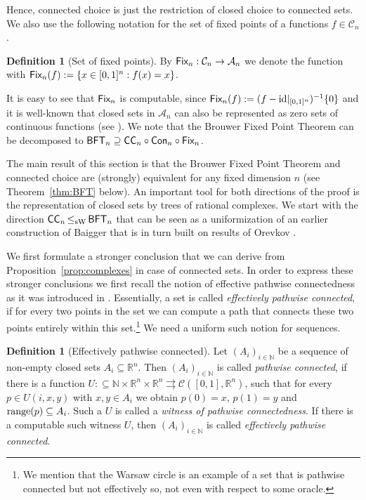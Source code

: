 \documentclass[a4paper]{amsart}
\def\AA{{\mathcal A}}
\def\CC{{\mathcal C}}
\def\IN{{\mathbb{N}}}
\def\IR{{\mathbb{R}}}
\def\In{\subseteq}
\def\mto{\rightrightarrows}
\def\id{{\rm id}}
\def\range{{\rm range}}
\def\BFT{\mbox{\rm\sffamily BFT}}
\def\ConC{\mbox{\rm\sffamily CC}}
\def\Con{\text{\rm\sffamily Con}}
\def\Fix{\text{\rm\sffamily Fix}}
\def\leqSW{\mathop{\leq_{\mathrm{sW}}}}
\theoremstyle{definition}
\newtheorem{definition}[theorem]{Definition}
\begin{document}
Hence, connected choice is just the restriction of closed choice to connected sets.
We also use the following notation for the set of fixed points of a functions $f\in\CC_n$.

\begin{definition}[Set of fixed points]
By $\Fix_n:\CC_n\to\AA_n$ we denote the function with $\Fix_n(f):=\{x\in[0,1]^n:f(x)=x\}$.
\end{definition}

It is easy to see that $\Fix_n$ is computable, since $\Fix_n(f):=(f-\id|_{[0,1]^n})^{-1}\{0\}$ and it is well-known
that closed sets in $\AA_n$ can also be represented as zero sets of continuous functions (see \cite{BW99,BP03}).
We note that the Brouwer Fixed Point Theorem can be decomposed to $\BFT_n\supseteq\ConC_n\circ\Con_n\circ\Fix_n$.

The main result of this section is that the Brouwer Fixed Point Theorem and connected choice
are (strongly) equivalent for any fixed dimension $n$ (see Theorem~\ref{thm:BFT} below).
An important tool for both directions of the proof is the representation of closed sets by trees
of rational complexes.
We start with the direction $\ConC_n\leqSW\BFT_n$ that can be seen as a uniformization of an earlier
construction of Baigger \cite{Bai85} that is in turn built on results of Orevkov \cite{Ore63}.

We first formulate a stronger conclusion that we can derive from Proposition~\ref{prop:complexes} in case of connected sets.
In order to express these stronger conclusions we first recall the notion of effective pathwise 
connectedness as it was introduced in \cite{Bra08}. Essentially, a set is called {\em effectively pathwise connected},
if for every two points in the set we can compute a path that connects these two points entirely within this set.\footnote{We mention that the Warsaw circle is an example of a set that is 
pathwise connected but not effectively so, not even with respect to some oracle.}
We need a uniform such notion for sequences.

\begin{definition}[Effectively pathwise connected]
Let $(A_i)_{i\in\IN}$ be a sequence of non-empty closed sets $A_i\In\IR^n$. 
Then $(A_i)_{i\in\IN}$ is called {\em pathwise connected},
if there is a function $U:\In\IN\times\IR^n\times\IR^n\mto\CC([0,1],\IR^n)$, such that
for every $p\in U(i,x,y)$ with $x,y\in A_i$ we obtain $p(0)=x$, $p(1)=y$ and $\range(p)\In A_i$.
Such a $U$ is called a {\em witness of pathwise connectedness}.
If there is a computable such witness $U$, then $(A_i)_{i\in\IN}$ is called {\em effectively pathwise connected}.
\end{definition}
 
\end{document}

